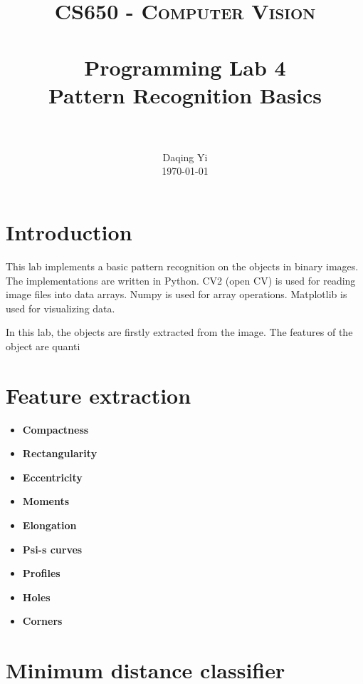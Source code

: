 \documentclass[paper=a4, fontsize=11pt]{scrartcl}
\title{
		\usefont{OT1}{bch}{b}{n}
		\normalfont \normalsize \textsc{CS650 - Computer Vision} \\ [25pt]
		\horrule{0.5pt} \\[0.4cm]
		\huge Programming Lab 4 \\ Pattern Recognition Basics \\
		\horrule{2pt} \\[0.5cm]
}
\author{
		\normalfont 								\normalsize
        Daqing Yi\\[-3pt]		\normalsize
        \today
}
\date{}
\begin{document}
\maketitle

\section{Introduction}
\label{sec:intro}

This lab implements a basic pattern recognition on the objects in binary images.
The implementations are written in Python.
CV2 (open CV) is used for reading image files into data arrays.
Numpy is used for array operations.
Matplotlib is used for visualizing data.

In this lab, the objects are firstly extracted from the image.
The features of the object are quanti

\section{Feature extraction}
\label{sec:feature_extraction}

\begin{itemize}
\item \textbf{Compactness}
\item \textbf{Rectangularity}
\item \textbf{Eccentricity}
\item \textbf{Moments}
\item \textbf{Elongation}
\item \textbf{Psi-s curves}
\item \textbf{Profiles}
\item \textbf{Holes}
\item \textbf{Corners}
\end{itemize}

\section{Minimum distance classifier}
\label{sec:classifier}
\end{document}
